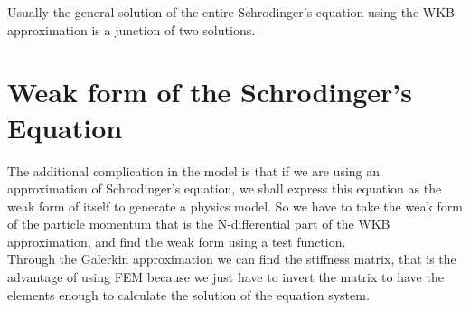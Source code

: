 \documentclass[11pt,a4paper,draft]{article}
\newcommand{\forceindent}{\leavevmode{\parindent=3em\indent}}
\begin{document}
\forceindent Usually the general solution of the entire Schrodinger's equation using the WKB approximation is a junction of two solutions.\\

\section{Weak form of the Schrodinger's Equation}

\forceindent {}The additional complication in the model is that if we are using an approximation of Schrodinger's equation, we shall express this equation as the weak form of itself to generate a physics model. So we have to take the weak form of the particle momentum that is the N-differential part of the WKB approximation, and find the weak form using a test function.\\
\forceindent Through the Galerkin approximation we can find the stiffness matrix, that is the advantage of using FEM because we just have to invert the matrix to have the elements enough to calculate the solution of the equation system.\\
\forceindent 
\end{document}
